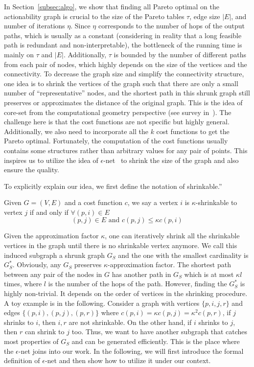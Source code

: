 \label{sec:scalability}
In Section~\ref{subsec:algo}, we show that finding all Pareto optimal on the actionability graph is crucial to the size of the Pareto tables $\tau$, edge size $|E|$, and number of iterations $\eta$. Since $\eta$ corresponds to the number of hops of the output paths, which is usually as a constant (considering in reality that a long feasible path is redundant and non-interpretable), the bottleneck of the running time is mainly on $\tau$ and $|E|$. Additionally, $\tau$ is bounded by the number of different paths from each pair of nodes, which highly depends on the size of the vertices and the connectivity. To decrease the graph size and simplify the connectivity structure, one idea is to shrink the vertices of the graph such that there are only a small number of ``representative'' nodes, and the shortest path in this shrunk graph still preserves or approximates the distance of the original graph. This is the idea of core-set from the computational geometry perspective (see survey in~\cite{agarwal2005geometric}). The challenge here is that the cost functions are not specific but highly general. Additionally,  we also need to incorporate all the $k$ cost functions to get the Pareto optimal. Fortunately, the computation of the cost functions usually contains some structures rather than arbitrary values for any pair of points. This inspires us to utilize the idea of $\epsilon$-net~\cite{haussler1986epsilon} to shrink the size of the graph and also ensure the quality. 

To explicitly explain our idea, we first define the notation of shrinkable.''

\begin{definition}
\label{def: shrinkable}
    Given $G=(V,E)$ and a cost function $c$, we say a vertex $i$ is $\kappa$-shrinkable to vertex $j$ if and only if $\forall (p,i) \in E$
    $$ 
    (p,j) \in E \text{ and } c(p,j) \leq \kappa c(p,i)
    $$
\end{definition}

Given the approximation factor $\kappa$, one can iteratively shrink all the shrinkable vertices in the graph until there is no shrinkable vertex anymore. We call this induced subgraph a shrunk graph $G_S$ and the one with the smallest cardinality is $G_S^*$. Obviously, any $G_S$  preserves $\kappa$-approximation factor. The shortest path between any pair of the nodes in $G$ has another path in $G_S$ which is at most $\kappa l$ times, where $l$ is the number of the hops of the path. However, finding the $G_S^*$ is highly non-trivial. It depends on the order of vertices in the shrinking procedure. A toy example is in the following. Consider a graph with vertices $\{p,i,j,r\}$ and edges $\{(p,i),(p,j),(p,r)\}$ where $c(p,i)=\kappa c(p,j)= \kappa^2 c(p,r)$, if $j$ shrinks to $i$, then $i,r$ are not shrinkable. On the other hand, if $i$ shrinks to $j$, then $r$ can shrink to $j$ too. Thus, we want to have another subgraph that catches most properties of $G_S$ and can be generated efficiently. This is the place where the $\epsilon$-net joins into our work. In the following, we will first introduce the formal definition of $\epsilon$-net and then show how to utilize it under our context.

